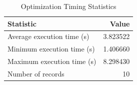 
\begin{table}[h!]
\centering
\begin{tabular}{l r}
\hline
Statistic & Value \\
\hline
Average execution time (s) & 3.823522 \\
Minimum execution time (s) & 1.406660 \\
Maximum execution time (s) & 8.298430 \\
Number of records & 10 \\
\hline
\end{tabular}
\caption{Optimization Timing Statistics}
\end{table}
